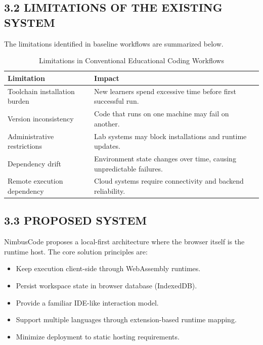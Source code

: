 \subsection{3.2 LIMITATIONS OF THE EXISTING SYSTEM}
The limitations identified in baseline workflows are summarized below.

\begin{table}[H]
\centering
\caption{Limitations in Conventional Educational Coding Workflows}
\begin{tabular}{p{4.2cm}p{8.8cm}}
\toprule
\textbf{Limitation} & \textbf{Impact} \\
\midrule
Toolchain installation burden & New learners spend excessive time before first successful run. \\
Version inconsistency & Code that runs on one machine may fail on another. \\
Administrative restrictions & Lab systems may block installations and runtime updates. \\
Dependency drift & Environment state changes over time, causing unpredictable failures. \\
Remote execution dependency & Cloud systems require connectivity and backend reliability. \\
\bottomrule
\end{tabular}
\end{table}

\subsection{3.3 PROPOSED SYSTEM}
NimbusCode proposes a local-first architecture where the browser itself is the runtime host. The core solution principles are:
\begin{itemize}[leftmargin=8mm]
\item Keep execution client-side through WebAssembly runtimes.
\item Persist workspace state in browser database (IndexedDB).
\item Provide a familiar IDE-like interaction model.
\item Support multiple languages through extension-based runtime mapping.
\item Minimize deployment to static hosting requirements.
\end{itemize}

